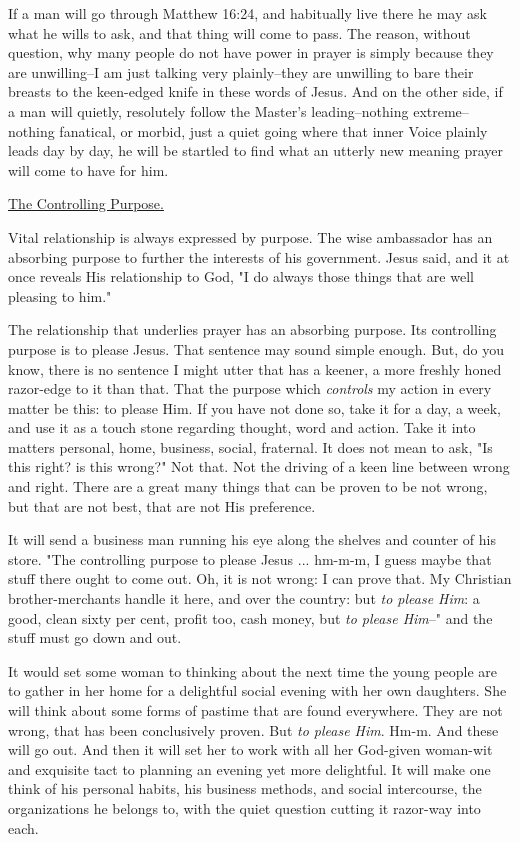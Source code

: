 If a man will go through Matthew 16:24, and habitually live there he may
ask what he wills to ask, and that thing will come to pass. The reason,
without question, why many people do not have power in prayer is simply
because they are unwilling--I am just talking very plainly--they are
unwilling to bare their breasts to the keen-edged knife in these words of
Jesus. And on the other side, if a man will quietly, resolutely follow the
Master's leading--nothing extreme--nothing fanatical, or morbid, just a
quiet going where that inner Voice plainly leads day by day, he will be
startled to find what an utterly new meaning prayer will come to have for
him.



\underline{The Controlling Purpose.}


Vital relationship is always expressed by purpose. The wise ambassador has
an absorbing purpose to further the interests of his government. Jesus
said, and it at once reveals His relationship to God, "I do always those
things that are well pleasing to him."

The relationship that underlies prayer has an absorbing purpose. Its
controlling purpose is to please Jesus. That sentence may sound simple
enough. But, do you know, there is no sentence I might utter that has a
keener, a more freshly honed razor-edge to it than that. That the purpose
which \textit{controls} my action in every matter be this: to please Him. If you
have not done so, take it for a day, a week, and use it as a touch stone
regarding thought, word and action. Take it into matters personal, home,
business, social, fraternal. It does not mean to ask, "Is this right? is
this wrong?" Not that. Not the driving of a keen line between wrong and
right. There are a great many things that can be proven to be not wrong,
but that are not best, that are not His preference.

It will send a business man running his eye along the shelves and counter
of his store. "The controlling purpose to please Jesus ... hm-m-m, I guess
maybe that stuff there ought to come out. Oh, it is not wrong: I can prove
that. My Christian brother-merchants handle it here, and over the country:
but \textit{to please Him}: a good, clean sixty per cent, profit too, cash money,
but \textit{to please Him}--" and the stuff must go down and out.

It would set some woman to thinking about the next time the young people
are to gather in her home for a delightful social evening with her own
daughters. She will think about some forms of pastime that are found
everywhere. They are not wrong, that has been conclusively proven. But \textit{to
please Him}. Hm-m. And these will go out. And then it will set her to
work with all her God-given woman-wit and exquisite tact to planning an
evening yet more delightful. It will make one think of his personal
habits, his business methods, and social intercourse, the organizations he
belongs to, with the quiet question cutting it razor-way into each.

